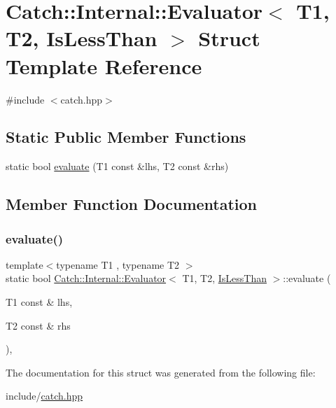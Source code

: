 \hypertarget{struct_catch_1_1_internal_1_1_evaluator_3_01_t1_00_01_t2_00_01_is_less_than_01_4}{}\section{Catch\+:\+:Internal\+:\+:Evaluator$<$ T1, T2, Is\+Less\+Than $>$ Struct Template Reference}
\label{struct_catch_1_1_internal_1_1_evaluator_3_01_t1_00_01_t2_00_01_is_less_than_01_4}


{\ttfamily \#include $<$catch.\+hpp$>$}

\subsection*{Static Public Member Functions}
\begin{DoxyCompactItemize}
\item 
static bool \mbox{\hyperlink{struct_catch_1_1_internal_1_1_evaluator_3_01_t1_00_01_t2_00_01_is_less_than_01_4_a75b2bcf80ce6f90218c145e2c3293d75}{evaluate}} (T1 const \&lhs, T2 const \&rhs)
\end{DoxyCompactItemize}


\subsection{Member Function Documentation}
\mbox{\label{struct_catch_1_1_internal_1_1_evaluator_3_01_t1_00_01_t2_00_01_is_less_than_01_4_a75b2bcf80ce6f90218c145e2c3293d75}} 
\subsubsection{\texorpdfstring{evaluate()}{evaluate()}}
{\footnotesize\ttfamily template$<$typename T1 , typename T2 $>$ \\
static bool \mbox{\hyperlink{class_catch_1_1_internal_1_1_evaluator}{Catch\+::\+Internal\+::\+Evaluator}}$<$ T1, T2, \mbox{\hyperlink{namespace_catch_1_1_internal_ae3f96598a7858155750bf38e7295d83eabbbfc41706595e50acbefa8408004b93}{Is\+Less\+Than}} $>$\+::evaluate (\begin{DoxyParamCaption}\item[{T1 const \&}]{lhs,  }\item[{T2 const \&}]{rhs }\end{DoxyParamCaption})\hspace{0.3cm}{\ttfamily [inline]}, {\ttfamily [static]}}



The documentation for this struct was generated from the following file\+:\begin{DoxyCompactItemize}
\item 
include/\mbox{\hyperlink{catch_8hpp}{catch.\+hpp}}\end{DoxyCompactItemize}
